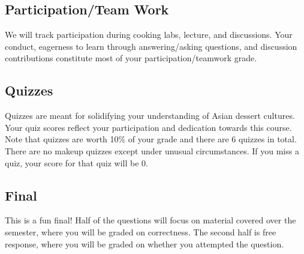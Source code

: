 \documentclass{article}
\begin{document}
\subsection{Participation/Team Work} We will track participation during cooking labs, lecture, and discussions. Your conduct, eagerness to learn through answering/asking questions, and discussion contributions constitute most of your participation/teamwork grade.  

\subsection{Quizzes}
Quizzes are meant for solidifying your understanding of Asian dessert cultures. Your quiz scores reflect your participation and dedication towards this course. Note that quizzes are worth 10\% of your grade and there are 6 quizzes in total. There are no makeup quizzes except under unusual circumstances. If you miss a quiz, your score for that quiz will be 0. 

\subsection{Final}
This is a fun final! Half of the questions will focus on material covered over the semester, where you will be graded on correctness. The second half is free response, where you will be graded on whether you attempted the question. 
\end{document}
